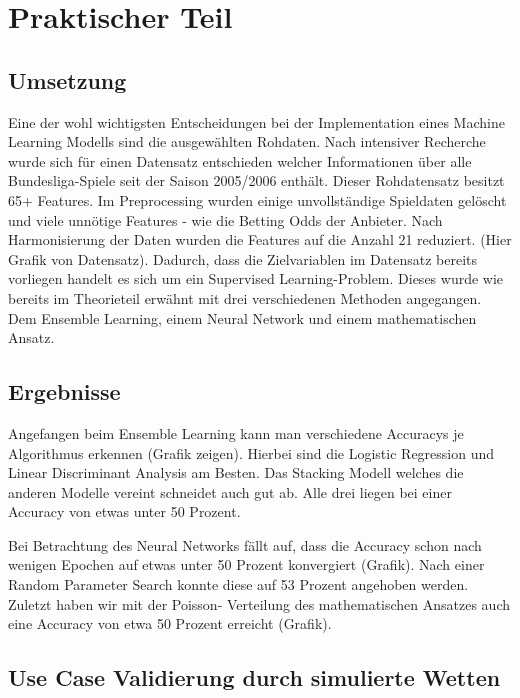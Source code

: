 \chapter{Praktischer Teil}

\section{Umsetzung}

Eine der wohl wichtigsten Entscheidungen bei der Implementation
eines Machine Learning Modells sind die ausgewählten Rohdaten.
Nach intensiver Recherche wurde sich für einen Datensatz
entschieden welcher Informationen über alle Bundesliga-Spiele
seit der Saison 2005/2006 enthält. Dieser Rohdatensatz besitzt
65+ Features. Im Preprocessing wurden einige unvollständige
Spieldaten gelöscht und viele unnötige Features - wie die Betting
Odds der Anbieter. Nach Harmonisierung der Daten wurden die
Features auf die Anzahl 21 reduziert.  (Hier Grafik von Datensatz).
 Dadurch, dass die Zielvariablen im Datensatz bereits vorliegen
 handelt es sich um ein Supervised Learning-Problem. Dieses wurde
 wie bereits im Theorieteil erwähnt mit drei verschiedenen
 Methoden angegangen. Dem Ensemble Learning, einem Neural Network
 und einem mathematischen Ansatz.

\section{Ergebnisse}

Angefangen beim Ensemble Learning kann man verschiedene Accuracys
je Algorithmus erkennen (Grafik zeigen). Hierbei sind die Logistic
Regression und Linear Discriminant Analysis am Besten. Das
Stacking Modell welches die anderen Modelle vereint schneidet
auch gut ab. Alle drei liegen bei einer Accuracy von etwas unter
50 Prozent.

Bei Betrachtung des Neural Networks fällt auf, dass die Accuracy
schon nach wenigen Epochen auf etwas unter 50 Prozent konvergiert
(Grafik). Nach einer Random Parameter Search konnte diese auf 53
Prozent angehoben werden. Zuletzt haben wir mit der Poisson-
Verteilung des mathematischen Ansatzes auch eine Accuracy von
etwa 50 Prozent erreicht (Grafik).

\section{Use Case Validierung durch simulierte Wetten}

